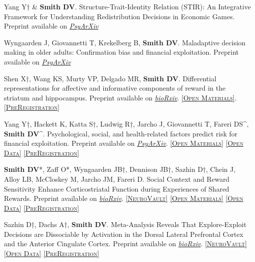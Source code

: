 \documentclass[11pt, letterpaper]{article}
\newcommand{\psyarxiv}[1]{\href{#1}{\textit{PsyArXiv}}}
\newcommand{\biorxiv}[1]{\href{#1}{\textit{bioRxiv}}}
\newcommand{\neurovault}[1]{\href{#1}{\scriptsize\textsc{[NeuroVault]}}}
\newcommand{\materials}[1]{\href{#1}{\scriptsize\textsc{[Open Materials]}}}
\newcommand{\data}[1]{\href{#1}{\scriptsize\textsc{[Open Data]}}}
\newcommand{\preregistration}[1]{\href{#1}{\scriptsize\textsc{[PreRegistration]}}}
\begin{document}
\begin{hangparas}{.5in}{1}

Yang Y† \& \textbf{Smith DV}. Structure-Trait-Identity Relation (STIR): An Integrative Framework for Understanding Redistribution Decisions in Economic Games. Preprint available on \psyarxiv{https://osf.io/preprints/psyarxiv/43nvt}

Wyngaarden J, Giovannetti T, Krekelberg B, \textbf{Smith DV}. Maladaptive decision making in older adults: Confirmation bias and financial exploitation. Preprint available on \psyarxiv{https://osf.io/preprints/psyarxiv/abnyd}

Shen X†, Wang KS, Murty VP, Delgado MR, \textbf{Smith DV}. Differential representations for affective and informative components of reward in the striatum and hippocampus. Preprint available on \biorxiv{https://doi.org/10.1101/2024.09.20.614186}. \materials{https://github.com/KarenShen21/ru-highres}. \preregistration{https://aspredicted.org/DKZ_W5Y}

Yang Y†, Hackett K, Katta S†, Ludwig R†, Jarcho J, Giovannetti T, Fareri DS\^{}, \textbf{Smith DV}\^{}. Psychological, social, and health-related factors predict risk for financial exploitation. Preprint available on \psyarxiv{https://doi.org/10.31234/osf.io/pb9ts}. \materials{https://osf.io/hd5nx/} \data{https://osf.io/hd5snx/} \preregistration{https://osf.io/hd5nx/}

\textbf{Smith DV}*, Zaff O*, Wyngaarden JB†, Dennison JB†, Sazhin D†, Chein J, Alloy LB, McCloskey M, Jarcho JM, Fareri D. Social Context and Reward Sensitivity Enhance Corticostriatal Function during Experiences of Shared Rewards. Preprint available on \biorxiv{https://doi.org/10.1101/2023.10.19.562908}. \neurovault{https://neurovault.org/collections/15006/} \materials{https://github.com/DVS-Lab/istart-sharedreward} \data{https://openneuro.org/datasets/ds004920} \preregistration{https://aspredicted.org/blind.php?x=SFX_MXL}

Sazhin D†, Dachs A†, \textbf{Smith DV}. Meta-Analysis Reveals That Explore-Exploit Decisions are Dissociable by Activation in the Dorsal Lateral Prefrontal Cortex and the Anterior Cingulate Cortex. Preprint available on \biorxiv{https://doi.org/10.1101/2023.10.21.563317}.  \neurovault{https://neurovault.org/collections/15560/} \data{https://osf.io/86kp9/} \preregistration{https://aspredicted.org/7hc7c.pdf} \\



\end{hangparas}
\end{document}
